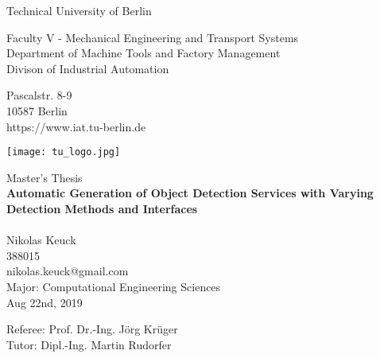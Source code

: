 \thispagestyle{empty}
\begin{center}

\vspace*{1.4cm}
{\LARGE Technical University of Berlin}

\vspace{0.5cm}
{\large Faculty V - Mechanical Engineering and Transport Systems\\[1mm]}
{\large Department of Machine Tools and Factory Management\\[1mm]}
{\large Divison of Industrial Automation\\[5mm]}

Pascalstr. 8-9\\
10587 Berlin\\
https://www.iat.tu-berlin.de\\

\vspace*{1cm}

\texttt{[image: tu\_logo.jpg]}

\vspace*{1.0cm}

{\LARGE Master's Thesis}\\

\vspace{1.0cm}
{\LARGE \textbf{Automatic Generation of Object Detection Services with Varying Detection Methods and Interfaces}}\\

{\LARGE \textbf{}}\\
\vspace*{0.5cm}
{\LARGE Nikolas Keuck}\\
388015\\
nikolas.keuck@gmail.com\\
Major: Computational Engineering Sciences
\\
\vspace*{0.5cm}
Aug 22nd, 2019\\ %
\vspace*{0.5cm}

Referee: Prof. Dr.-Ing. Jörg Krüger\\
Tutor: Dipl.-Ing. Martin Rudorfer



\end{center}
\restoregeometry
